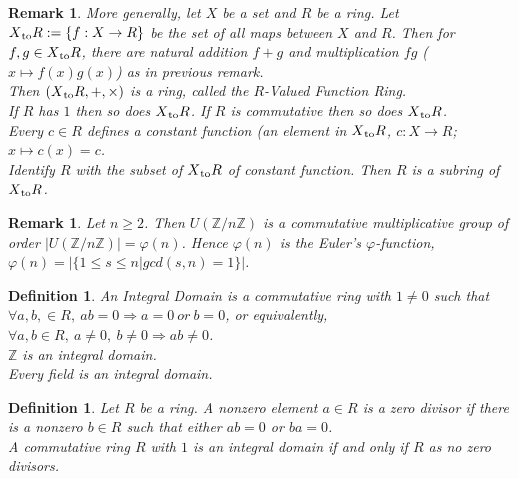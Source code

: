 \documentclass[a4paper,sfsidenotes,openany]{tufte-book}
\theoremstyle{theorem}
\newtheorem{definition}[theorem]{Definition}
\newtheorem{remark}[theorem]{Remark}
\begin{document}
\begin{fullwidth}
\begin{remark}
More generally, let $X$ be a set and $R$ be a ring. Let $X \textsubscript{to} R := \{f: X \rightarrow R\}$ be the set of all maps between $X$ and $R$. Then for $f, g \in X \textsubscript{to} R $, there are natural addition $f+g$ and multiplication $fg$ ($x\mapsto f(x)g(x)$) as in previous remark.\\
Then $(X \textsubscript{to} R, +, \times)$ is a ring, called the \textit{{\color{blue} $R$-Valued Function Ring}}.\\
If $R$ has $1$ then so does $X \textsubscript{to} R$. If $R$ is commutative then so does $X \textsubscript{to} R$.\\
Every $c\in R$ defines a constant function (an element in $X \textsubscript{to} R$, $c:X\rightarrow R$; $x \mapsto c(x)=c$.\\
Identify $R$ with the subset of $X \textsubscript{to} R$ of constant function. Then $R$ is a subring of $X \textsubscript{to} R$.\\
\end{remark}
\>

\begin{remark}
Let $n \geq 2$. Then $U(\mathbb{Z}/n\mathbb{Z})$ is a commutative multiplicative group of order $\left| U(\mathbb{Z}/n\mathbb{Z}) \right| = \varphi (n)$.
Hence $\varphi (n)$ is the \textit{{\color{blue} Euler's $\varphi$-function}}, $\varphi (n)=\left|\{1 \leq s \leq n | gcd(s, n) = 1\}\right|$.\\
\end{remark}
\>

\begin{definition}
An \textit{{\color{blue} Integral Domain}} is a commutative ring with $1\neq 0$ such that $\forall a, b, \in R, \ ab = 0 \Rightarrow a=0 \ or \ b=0$,
or equivalently, $\forall a, b \in R, \ a \neq 0, \ b \neq 0 \Rightarrow ab \neq 0$.\\
$\mathbb{Z}$ is an integral domain.\\
Every field is an integral domain.\\
\end{definition}
\>

\begin{definition}
Let $R$ be a ring. A nonzero element $a \in R$ is a 	\textit{{\color{blue} zero divisor}} if there is a nonzero $b\in R$ such that either $ab=0$ or $ba=0$.\\
A commutative ring $R$ with $1$ is an integral domain if and only if $R$ as no zero divisors.\\
\end{definition}
\>


\end{fullwidth}
\end{document}

